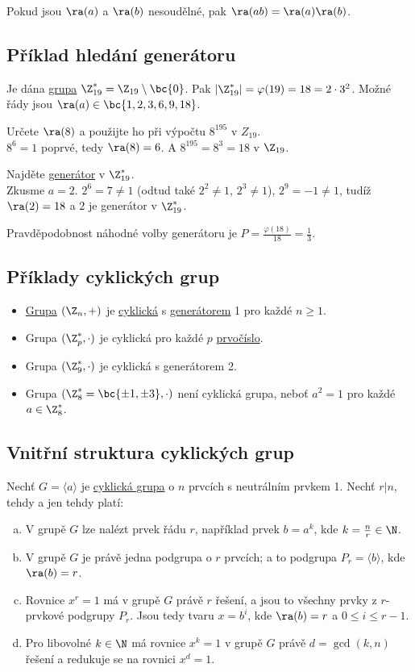 Pokud jsou $\ra(a)$ a $\ra(b)$ nesoudělné, pak $\ra(ab) = \ra(a) \ra(b)$.

\subsection{Příklad hledání generátoru}
Je dána \hyperref[grupa]{grupa} $\Z_{19}^* = \Z_{19} \setminus \bc{0}$. Pak $|\Z_{19}^*| = \varphi(19) = 18 = 2 \cdot 3^2$. Možné řády jsou $\ra(a) \in \bc{1, 2, 3, 6, 9, 18}$.

Určete $\ra(8)$ a použijte ho při výpočtu $8^{195}$ v $Z_{19}$.\\
$8^6 = 1$ poprvé, tedy $\ra(8) = 6$. A $8^{195} = 8^3 = 18$ v $\Z_{19}$.

Najděte \hyperref[generator]{generátor} v $\Z_{19}^*$.\\
Zkusme $a=2$. $2^6 = 7 \not=1$ (odtud také $2^2 \not=1$, $2^3 \not=1$), $2^9 = -1 \not=1$, tudíž $\ra(2)=18$ a $2$ je generátor v $\Z_{19}^*$.

Pravděpodobnost náhodné volby generátoru je $P = \frac{\varphi(18)}{18} = \frac{1}{3}$.

\subsection{Příklady cyklických grup}
\vspace{-1em}
\begin{itemize}
	\item \hyperref[grupa]{Grupa} $(\Z_n, +)$ je \hyperref[cyklGrupa]{cyklická} s \hyperref[generator]{generátorem} 1 pro každé $n \geq 1$.
	\item Grupa $(\Z_p^*, \cdot)$ je cyklická pro každé $p$ \hyperref[prvocisla]{prvočíslo}. 
	\item Grupa $(\Z_9^*, \cdot)$ je cyklická s generátorem 2. 
	\item Grupa $(\Z_8^* = \bc{\pm1, \pm3}, \cdot)$ není cyklická grupa, neboť $a^2 = 1$ pro každé $a \in \Z_8^*$. 
\end{itemize}

\subsection{Vnitřní struktura cyklických grup}
Nechť $G = \langle a \rangle$ je \hyperref[cyklGrupa]{cyklická grupa} o $n$ prvcích s neutrálním prvkem 1. Nechť $r | n$, tehdy a jen tehdy platí:
\vspace{-1em}
\begin{enumerate}[a)]
	\item V grupě $G$ lze nalézt prvek řádu $r$, například prvek $b = a^k$, kde $k = \frac{n}{r} \in \N$.
	\item V grupě $G$ je právě jedna podgrupa o $r$ prvcích; a to podgrupa $P_r = \langle b\rangle$, kde $\ra(b) = r$.
	\item Rovnice $x^r = 1$ má v grupě $G$ právě $r$ řešení, a jsou to všechny prvky z $r$-prvkové podgrupy $P_r$. Jsou tedy tvaru $x = b^i$, kde $\ra(b) = r$ a $0 \leq i \leq r-1$.
	\item Pro libovolné $k \in \N$ má rovnice $x^k = 1$ v grupě $G$ právě $d = \gcd(k, n)$ řešení a redukuje se na rovnici $x^d = 1$.
\end{enumerate}

